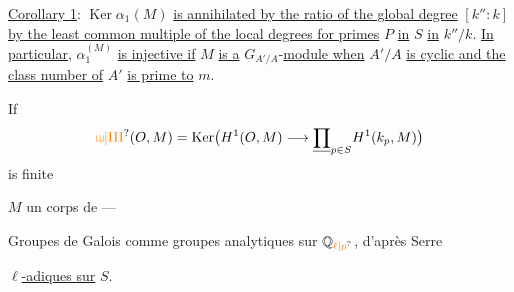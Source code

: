 \uline{Corollary 1}: $\operatorname{Ker}\alpha_1(M)$ \uline{is annihilated by the ratio of the global degree} $[k'':k]$ \uline{by the least common multiple of the local degrees for primes} $P$ \uline{in} $S$ \uline{in} $k''/k$. \uline{In particular}, $\alpha_1^{(M)}$ \uline{is injective if} $M$ \uline{is a} $G_{A'/A}$-\uline{module when} $A'/A$ \uline{is cyclic and the class number of} $A'$ \uline{is prime to} $m$.



If
\[
\unsure{\vcenter{\hbox{\begin{tikzpicture}[x=.6ex,y=1ex]\draw (0,1)--(0,0)--(2,0)--(2,1);\draw (1,0)--(1,1);\end{tikzpicture}}}|\mathrm{III}}(O,M)=\operatorname{Ker}\bigl(H^1(O,M)\longrightarrow\underline{\prod}_{p\in S}H^1(k_p,M)\bigr)
\]
is finite

$M$    un corps de  ---

Groupes de Galois comme groupes analytiques sur $\mathbb Q_{\unsure{\ell|p}}$, d'après Serre

\uline{ $\ell$-adiques sur} $S$.

